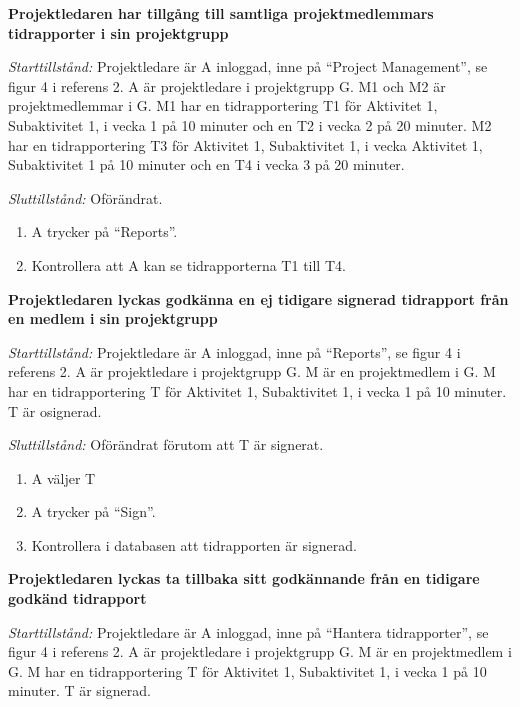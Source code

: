 \documentclass[a4paper]{article}
\begin{document}
\begin{FT}

\item
\textbf{Projektledaren har tillgång till samtliga projektmedlemmars tidrapporter i sin projektgrupp}

\emph{Starttillstånd:} Projektledare är A inloggad, inne på ``Project Management'', se figur 4 i referens 2. A är projektledare i projektgrupp G. M1 och M2 är projektmedlemmar i G. M1 har en tidrapportering T1 för Aktivitet 1, Subaktivitet 1, i vecka 1 på 10 minuter och en T2 i vecka 2 på 20 minuter. M2 har en tidrapportering T3 för Aktivitet 1, Subaktivitet 1, i vecka Aktivitet 1, Subaktivitet 1 på 10 minuter och en T4 i vecka 3 på 20 minuter. 

\emph{Sluttillstånd:} Oförändrat.

\begin{enumerate}
\item A trycker på ``Reports''.
\item Kontrollera att A kan se tidrapporterna T1 till T4.
\end{enumerate}


\item
\textbf{Projektledaren lyckas godkänna en ej tidigare signerad tidrapport från en medlem i sin projektgrupp}

\emph{Starttillstånd:} Projektledare är A inloggad, inne på ``Reports'', se figur 4 i referens 2. A är projektledare i projektgrupp G. M är en projektmedlem i G. M har en tidrapportering T för Aktivitet 1, Subaktivitet 1, i vecka 1 på 10 minuter. T är osignerad.

\emph{Sluttillstånd:} Oförändrat förutom att T är signerat.

\begin{enumerate}
\item A väljer T
\item A trycker på ``Sign''.
\item Kontrollera i databasen att tidrapporten är signerad.
\end{enumerate}


\item
\textbf{Projektledaren lyckas ta tillbaka sitt godkännande från en tidigare godkänd tidrapport}

\emph{Starttillstånd:} Projektledare är A inloggad, inne på ``Hantera tidrapporter'', se figur 4 i referens 2. A är projektledare i projektgrupp G. M är en projektmedlem i G. M har en tidrapportering T för Aktivitet 1, Subaktivitet 1, i vecka 1 på 10 minuter. T är signerad.


\end{FT}
\end{document}
